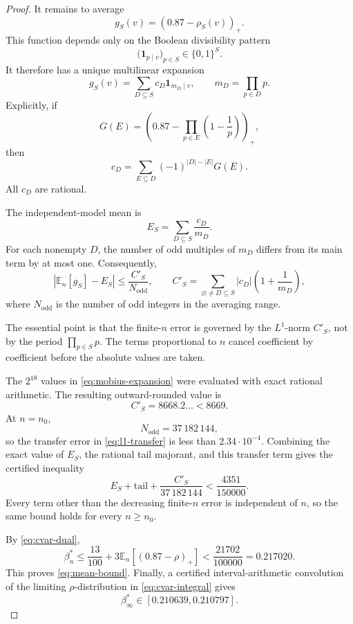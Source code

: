 \documentclass{article}
\theoremstyle{remark}
\newcommand{\ind}{\mathbf{1}}
\begin{document}
\begin{proof}
It remains to average
\[
 g_S(v)=(0.87-\rho_S(v))_+.
\]
This function depends only on the Boolean divisibility pattern
\[
 \bigl(\ind_{p\mid v}\bigr)_{p\in S}\in\{0,1\}^{S}.
\]
It therefore has a unique multilinear expansion
\begin{equation}\label{eq:mobius-expansion}
 g_S(v)
 =
 \sum_{D\subseteq S}c_D\ind_{m_D\mid v},
 \qquad
 m_D=\prod_{p\in D}p.
\end{equation}
Explicitly, if
\[
 G(E)=
 \left(
  0.87-\prod_{p\in E}\left(1-\frac1p\right)
 \right)_+,
\]
then
\[
 c_D=
 \sum_{E\subseteq D}
 (-1)^{|D|-|E|}G(E).
\]
All \(c_D\) are rational.

The independent-model mean is
\[
 E_S=\sum_{D\subseteq S}\frac{c_D}{m_D}.
\]
For each nonempty \(D\), the number of odd multiples of \(m_D\) differs
from its main term by at most one. Consequently,
\begin{equation}\label{eq:l1-transfer}
 \left|
  \mathbb E_n[g_S]-E_S
 \right|
 \leq
 \frac{C'_S}{N_{\mathrm{odd}}},
 \qquad
 C'_S=
 \sum_{\varnothing\neq D\subseteq S}
 |c_D|\left(1+\frac1{m_D}\right),
\end{equation}
where \(N_{\mathrm{odd}}\) is the number of odd integers in the
averaging range.

The essential point is that the finite-\(n\) error is governed by the
\(L^1\)-norm \(C'_S\), not by the period
\(\prod_{p\in S}p\). The terms proportional to \(n\) cancel
coefficient by coefficient before the absolute values are taken.

The \(2^{18}\) values in \eqref{eq:mobius-expansion} were evaluated
with exact rational arithmetic. The resulting outward-rounded value is
\[
 C'_S=8668.2\ldots<8669.
\]
At \(n=n_0\),
\[
 N_{\mathrm{odd}}=37\,182\,144,
\]
so the transfer error in \eqref{eq:l1-transfer} is less than
\(2.34\cdot10^{-4}\). Combining the exact value of \(E_S\), the
rational tail majorant, and this transfer term gives the certified
inequality
\[
 E_S+\text{tail}+\frac{C'_S}{37\,182\,144}
 <
 \frac{4351}{150000}.
\]
Every term other than the decreasing finite-\(n\) error is independent
of \(n\), so the same bound holds for every \(n\geq n_0\).

By \eqref{eq:cvar-dual},
\[
 \beta^\ast_n
 \leq
 \frac{13}{100}
 +3\mathbb E_n[(0.87-\rho)_+]
 <
 \frac{21702}{100000}
 =
 0.217020.
\]
This proves \eqref{eq:mean-bound}. Finally, a certified
interval-arithmetic convolution of the limiting \(\rho\)-distribution
in \eqref{eq:cvar-integral} gives
\[
 \beta^\ast_\infty\in[0.210639,0.210797].
\]
\end{proof}
\end{document}
